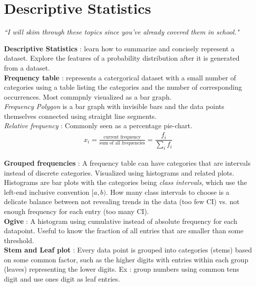 \chapter{Descriptive Statistics}


\begin{flushright}
	\textit{``I will skim through these topics since you've already covered them in school."} \\
\end{flushright}

\textbf{Descriptive Statistics} : learn how to summarize and concisely represent a dataset. Explore the features of a probability distribution after it is generated from a dataset. \\

\textbf{Frequency table} : represents a catergorical dataset with a small number of categories using a table listing the categories and the number of corresponding occurrences. Most commpnly visualized as a bar graph. \\

\textit{Frequency Polygon} is a bar graph with invisible bars and the data points themselves connected using straight line segments.\\

\textit{Relative frequency} : Commonly seen as a percentage pie-chart. \\ 
	\begin{align}
	x_{i} = \frac{\text{current frequency}}{\text{sum of all frequencies}} = \dfrac{f_{i}}{ \sum_{i} f_{i}} 
	\end{align}

\textbf{Grouped frequencies} : A frequency table can have categories that are intervals instead of discrete categories. Visualized using histograms and related plots. Histograms are bar plots with the categories being \textit{class intervals}, which use the left-end inclusive convention $[a, b)$. How many class intervals to choose is a delicate balance between not revealing trends in the data (too few CI) vs. not enough frequency for each entry (too many CI). \\

\textbf{Ogive} : A histogram using cumulative instead of absolute frequency for each datapoint. Useful to know the fraction of all entries that are smaller than some threshold. \\

\textbf{Stem and Leaf plot} : Every data point is grouped into categories (stems) based on some common factor, such as the higher digits with entries within each group (leaves) representing the lower digits. Ex : group numbers using common tens digit and use ones digit as leaf entries. \\

